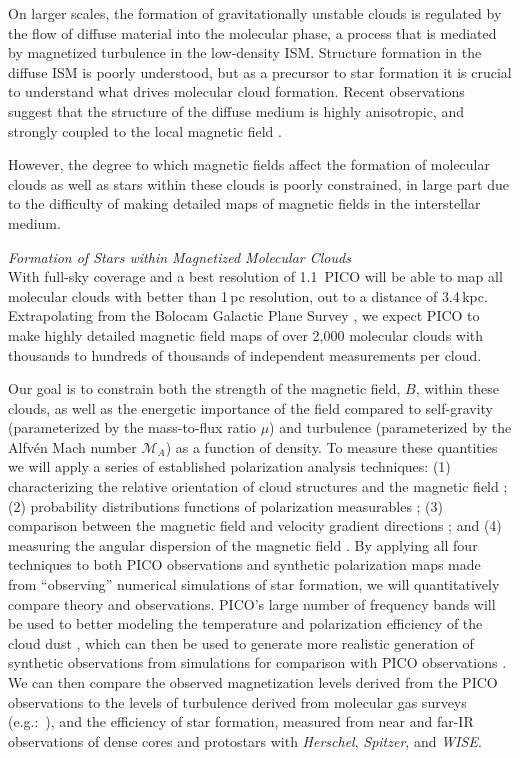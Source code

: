 \documentclass[PICOReport.tex]{subfiles}
\begin{document}
On larger scales, the formation of gravitationally unstable clouds is regulated by the flow of diffuse material into the molecular phase, a process that is mediated by magnetized turbulence in the low-density ISM. Structure formation in the diffuse ISM is poorly understood, but as a precursor to star formation it is crucial to understand what drives molecular cloud formation. Recent observations suggest that the structure of the diffuse medium is highly anisotropic, and strongly coupled to the local magnetic field \citep{Clark:2014, Clark:2015, Kalberla:2016, KalberlaKerp:2016}.

However, the degree to which magnetic fields affect the formation of molecular clouds as well as stars within these clouds is poorly constrained, in large part due to the difficulty of making detailed maps of magnetic fields in the interstellar medium.


{\em Formation of Stars within Magnetized Molecular Clouds}\\
With full-sky coverage and a best resolution of 1.1\arcmin~PICO will be able to map all molecular clouds with better than 1\,pc resolution, out to a distance of 3.4\,kpc.  Extrapolating from the Bolocam Galactic Plane Survey \citep[BGPS,][]{EllsworthBowers2015}, we expect 
PICO to make highly detailed magnetic field maps of over 2,000 molecular clouds with thousands to hundreds of thousands of independent measurements per cloud. 

Our goal is to constrain both the strength of the magnetic field, $B$, within these clouds, as well as the energetic importance of the field compared to self-gravity (parameterized by the mass-to-flux ratio $\mu$) and turbulence (parameterized by the Alfv\'{e}n Mach number $\mathcal{M}_A$) as a function of density. 
To measure these quantities we will apply a series of established polarization analysis techniques:
(1) characterizing the relative orientation of cloud structures and the magnetic field \citep{Soler2013,Chen2016,Soler2017,Planck:XXXV}; (2) probability distributions functions of polarization measurables \citep{Fissel2016, King2018}; (3) comparison between the magnetic field and velocity gradient directions \citep{GonzalezCasanova2017,Yuen2017}; and (4) measuring the angular dispersion of the magnetic field  \citep{Davis1951,Chandrasekhar1953, Hildebrand2009,Houde2009}.
By applying all four techniques to both PICO observations and synthetic polarization maps made from ``observing'' numerical simulations of star formation, we will quantitatively compare theory and observations. PICO's large number of frequency bands will be used to better modeling the temperature and polarization efficiency of the cloud dust  \citep{Andersson2015}, which can then be used to generate more realistic generation of synthetic observations from simulations for comparison with PICO observations \citep{Seifried2018}. We can then compare the observed magnetization levels derived from the PICO observations to the levels of turbulence derived from molecular gas surveys (e.g.:~\citealt{EllsworthBowers2015, Miville-Deschenes2017}), and the efficiency of star formation, measured from near and far-IR observations of dense cores and protostars with {\em Herschel}, {\em Spitzer}, and {\em WISE}. 
\end{document}

